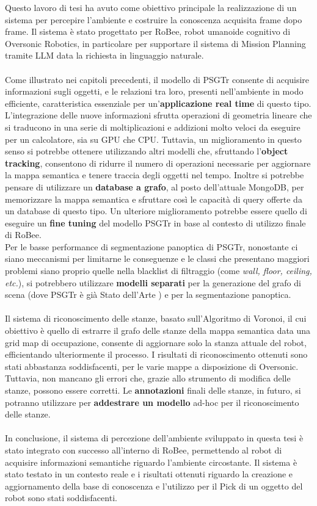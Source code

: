 Questo lavoro di tesi ha avuto come obiettivo principale la realizzazione di un sistema per percepire l'ambiente e costruire la conoscenza acquisita frame dopo frame. Il sistema è stato progettato per RoBee, robot umanoide cognitivo di Oversonic Robotics, in particolare per supportare il sistema di Mission Planning tramite LLM data la richiesta in linguaggio naturale. \\
\\
Come illustrato nei capitoli precedenti, il modello di PSGTr consente di acquisire informazioni sugli oggetti, e le relazioni tra loro, presenti nell'ambiente in modo efficiente, caratteristica essenziale per un'\textbf{applicazione real time} di questo tipo. L'integrazione delle nuove informazioni sfrutta operazioni di geometria lineare che si traducono in una serie di moltiplicazioni e addizioni molto veloci da eseguire per un calcolatore, sia su GPU che CPU. Tuttavia, un miglioramento in questo senso si potrebbe ottenere utilizzando altri modelli che, sfruttando l'\textbf{object tracking}, consentono di ridurre il numero di operazioni necessarie per aggiornare la mappa semantica e tenere traccia degli oggetti nel tempo. Inoltre si potrebbe pensare di utilizzare un \textbf{database a grafo}, al posto dell'attuale MongoDB, per memorizzare la mappa semantica e sfruttare così le capacità di query offerte da un database di questo tipo. Un ulteriore miglioramento potrebbe essere quello di eseguire un \textbf{fine tuning} del modello PSGTr in base al contesto di utilizzo finale di RoBee.\\
Per le basse performance di segmentazione panoptica di PSGTr, nonostante ci siano meccanismi per limitarne le conseguenze e le classi che presentano maggiori problemi siano proprio quelle nella blacklist di filtraggio (come \textit{wall, floor, ceiling, etc.}), si potrebbero utilizzare \textbf{modelli separati} per la generazione del grafo di scena (dove PSGTr è già Stato dell'Arte ) e per la segmentazione panoptica.\\
\\
Il sistema di riconoscimento delle stanze, basato sull'Algoritmo di Voronoi, il cui obiettivo è quello di estrarre il grafo delle stanze della mappa semantica data una grid map di occupazione, consente di aggiornare solo la stanza attuale del robot, efficientando ulteriormente il processo. I risultati di riconoscimento ottenuti sono stati abbastanza soddisfacenti, per le varie mappe a disposizione di Oversonic. Tuttavia, non mancano gli errori che, grazie allo strumento di modifica delle stanze, possono essere corretti. Le \textbf{annotazioni} finali delle stanze, in futuro, si potranno utilizzare per \textbf{addestrare un modello} ad-hoc per il riconoscimento delle stanze.
\\
\\
In conclusione, il sistema di percezione dell'ambiente sviluppato in questa tesi è stato integrato con successo all'interno di RoBee, permettendo al robot di acquisire informazioni semantiche riguardo l'ambiente circostante. Il sistema è stato testato in un contesto reale e i risultati ottenuti riguardo la creazione e aggiornamento della base di conoscenza e l'utilizzo per il Pick di un oggetto del robot sono stati soddisfacenti.